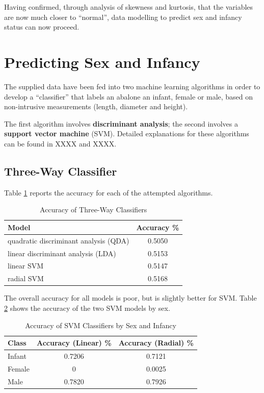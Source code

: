\documentclass[11pt, a4paper]{article}
\begin{document}
    Having confirmed, through analysis of skewness and kurtosis, that the variables are now much closer to ``normal'', data modelling to predict sex and infancy status can now proceed.

    \section{Predicting Sex and Infancy}

    The supplied data have been fed into two machine learning algorithms in order to develop a ``classifier'' that labels an abalone an infant, female or male, based on non-intrusive measurements (length, diameter and height). 

    The first algorithm involves \textbf{discriminant analysis}; the second involves a \textbf{support vector machine} (SVM). Detailed explanations for these algorithms can be found in XXXX and XXXX. 

    \subsection{Three-Way Classifier}

    Table \ref{three-way} reports the accuracy for each of the attempted algorithms.

    \begin{table}[ht]
        \centering
        \begin{tabular}{|l|c|}
            \hline
            Model & Accuracy \% \\
            \hline
            quadratic discriminant analysis (QDA) & 0.5050 \\
            linear discriminant analysis (LDA) & 0.5153 \\
            linear SVM & 0.5147 \\
            radial SVM & 0.5168 \\
            \hline
        \end{tabular}
        \caption{Accuracy of Three-Way Classifiers}
        \label{three-way}
    \end{table}

    The overall accuracy for all models is poor, but is slightly better for SVM. Table \ref{svm-acc} shows the accuracy of the two SVM models by sex.

    \begin{table}[ht]
        \centering
        \begin{tabular}{|l|c|c|}
            \hline
            Class & Accuracy (Linear) \% & Accuracy (Radial) \% \\
            \hline
            Infant & 0.7206 & 0.7121 \\
            Female & 0 & 0.0025 \\
            Male & 0.7820 & 0.7926 \\
            \hline
        \end{tabular}
        \caption{Accuracy of SVM Classifiers by Sex and Infancy}
        \label{svm-acc}
    \end{table}
\end{document}
